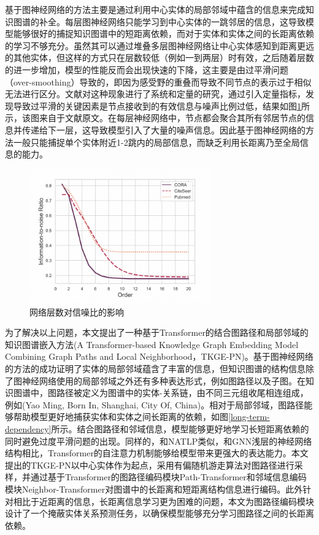 基于图神经网络的方法主要是通过利用中心实体的局部邻域中蕴含的信息来完成知识图谱的补全。每层图神经网络只能学习到中心实体的一跳邻居的信息，这导致模型能够很好的捕捉知识图谱中的短距离依赖，而对于实体和实体之间的长距离依赖的学习不够充分。虽然其可以通过堆叠多层图神经网络让中心实体感知到距离更远的其他实体，但这样的方式只在层数较低（例如一到两层）时有效，之后随着层数的进一步增加，模型的性能反而会出现快速的下降，这主要是由过平滑问题（over-smoothing）导致的，即因为感受野的重叠而导致不同节点的表示过于相似无法进行区分。文献\cite{over-smoothing}对这种现象进行了系统和定量的研究，通过引入定量指标，发现导致过平滑的关键因素是节点接收到的有效信息与噪声比例过低，结果如图\ref{information-noise}所示，该图来自于文献\cite{over-smoothing}原文。在每层神经网络中，节点都会聚合其所有邻居节点的信息并传递给下一层，这导致模型引入了大量的噪声信息。因此基于图神经网络的方法一般只能捕捉单个实体附近1-2跳内的局部信息，而缺乏利用长距离乃至全局信息的能力。
\begin{figure}[htb]
  \centerline{\includegraphics[width=0.7\textwidth]{pic/information-noise.png}}
  \caption{网络层数对信噪比的影响}
  \label{information-noise}
\end{figure}

为了解决以上问题，本文提出了一种基于Transformer的结合图路径和局部邻域的知识图谱嵌入方法(A Transformer-based Knowledge Graph Embedding Model Combining Graph Paths and Local Neighborhood，TKGE-PN)。基于图神经网络的方法的成功证明了实体的局部邻域蕴含了丰富的信息，但知识图谱的结构信息除了图神经网络使用的局部邻域之外还有多种表达形式，例如图路径以及子图。在知识图谱中，图路径被定义为图谱中的实体-关系链，由不同三元组收尾相连组成，例如(Yao Ming, Born In, Shanghai, City Of, China)。相对于局部邻域，图路径能够帮助模型更好地捕获实体和实体之间长距离的依赖，如图\ref{long-term-dependency}所示。结合图路径和邻域信息，模型能够更好地学习长短距离依赖的同时避免过度平滑问题的出现。同样的，和NATLP类似，和GNN浅层的神经网络结构相比，Transformer的自注意力机制能够给模型带来更强大的表达能力。本文提出的TKGE-PN以中心实体作为起点，采用有偏随机游走算法对图路径进行采样，并通过基于Transformer的图路径编码模块Path-Transformer和邻域信息编码模块Neighbor-Transformer对图谱中的长距离和短距离结构信息进行编码。此外针对相比于近距离的信息，长距离信息学习更为困难的问题，本文为图路径编码模块设计了一个掩蔽实体关系预测任务，以确保模型能够充分学习图路径之间的长距离依赖。

